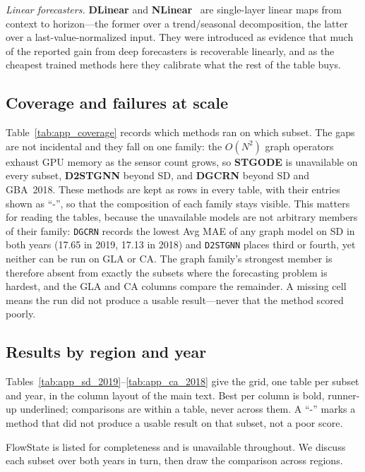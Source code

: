 \textit{Linear forecasters.} \textbf{DLinear} and \textbf{NLinear}~\citep{zeng2023transformers}
are single-layer linear maps from context to horizon---the former over a
trend/seasonal decomposition, the latter over a last-value-normalized input.
They were introduced as evidence that much of the reported gain from deep
forecasters is recoverable linearly, and as the cheapest trained methods here
they calibrate what the rest of the table buys.

\subsection{Coverage and failures at scale}
\label{app:extended:coverage}

Table~\ref{tab:app_coverage} records which methods ran on which subset. The
gaps are not incidental and they fall on one family: the $O(N^2)$ graph
operators exhaust GPU memory as the sensor count grows, so \textbf{STGODE} is
unavailable on every subset, \textbf{D2STGNN} beyond SD, and \textbf{DGCRN}
beyond SD and GBA~2018. These methods are kept as rows in every table, with
their entries shown as ``-'', so that the composition of each family stays
visible. This matters for reading the tables, because the
unavailable models are not arbitrary members of their family: \texttt{DGCRN}
records the lowest Avg MAE of any graph model on SD in both years (17.65 in 2019,
17.13 in 2018) and \texttt{D2STGNN} places third or fourth, yet neither can be
run on GLA or CA. The graph family's strongest member is therefore absent from
exactly the subsets where the forecasting problem is hardest, and the GLA and CA
columns compare the remainder. A missing cell means the run did not produce a usable result---never
that the method scored poorly.


\subsection{Results by region and year}
\label{app:extended:tables}

Tables~\ref{tab:app_sd_2019}--\ref{tab:app_ca_2018} give the grid, one table per
subset and year, in the column layout of the main text. Best per column is bold,
runner-up underlined; comparisons are within a table, never across them. A
``-'' marks a method that did not produce a usable result on that subset, not a
poor score.

FlowState is listed for completeness and is unavailable throughout. We discuss
each subset over both years in turn, then draw the comparison across regions.

